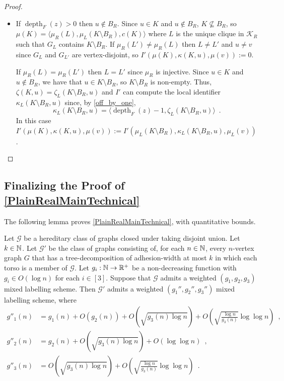 \documentclass{patmorin}
\let\eqref\cref
\newcommand{\david}[1]{\noindent{\color{orange} DW: #1}}
\newcommand{\vida}[1]{\noindent{\color{pink} VD: #1}}
\DeclareMathOperator{\depth}{depth}
\newcommand{\Oh}{O}
\begin{document}
\begin{proof}
\begin{itemize}
\begin{itemize}
      \item If $\depth_F(z)>0$ then $u\not\in B_R$.  Since $u\in K$ and $u\not\in B_R$, $K\not\subseteq B_R$, so $\mu(K)=\langle \mu_R(L),\mu_{L}(K\setminus B_R),c(K)\rangle$ where $L$ is the unique clique in $\mathcal{K}_R$ such that $G_L$ contains $K\setminus B_R$.  If $\mu_R(L')\neq \mu_R(L)$ then $L\neq L'$ and $u\neq v$ since $G_{L}$ and $G_{L'}$ are vertex-disjoint, so $I'(\mu(K),\kappa(K,u),\mu(v)):=0$.

      If $\mu_R(L)=\mu_R(L')$ then $L=L'$ since $\mu_R$ is injective.
      Since $u\in K$ and $u\not\in B_R$, we have that $u\in K\setminus B_R$, so $K\setminus B_R$ is non-empty. Thus, $\zeta(K,u)=\zeta_L(K\setminus B_R,u)$
      and $I'$ can compute the local identifier $\kappa_L(K\setminus B_R,u)$ since, by \eqref{off_by_one},
      \[
        \kappa_L(K\setminus B_R,u) = \langle \depth_F(z)-1, \zeta_L(K\setminus B_R,u)\rangle\enspace.
      \]
      In this case $I'(\mu(K),\kappa(K,u),\mu(v)):=I'(\mu_L(K\setminus B_R),\kappa_L(K\setminus B_R,u),\mu_L(v))$. \qedhere
    \end{itemize}
  \end{itemize}
\end{proof}

\subsection{Finalizing the Proof of \texorpdfstring{\cref{PlainRealMainTechnical}}{Theorem \ref*{PlainRealMainTechnical}}}
\label{sec:finalizing}

The following lemma proves \cref{PlainRealMainTechnical}, with quantitative bounds.

\begin{lem}\label{RealMainTechnical}
  Let $\mathcal{G}$ be a hereditary class of graphs closed under taking disjoint union.
  Let $k\in\mathbb{N}$.
  Let $\mathcal{G}'$ be the class of graphs consisting of, for each $n\in\mathbb{N}$,  every $n$-vertex graph $G$ that has a tree-decomposition of adhesion-width at most $k$ in which each torso is a member of $\mathcal{G}$.
  Let $g_i:\mathbb{N}\to\mathbb{R}^+$ be a non-decreasing function with $g_i\in\Oh(\log n)$ for each $i\in[3]$.
  Suppose that $\mathcal{G}$ admits a weighted $(g_1,g_2,g_3)$ mixed labelling scheme.
  Then $\mathcal{G}'$ admits a weighted $(g_1'',g_2'',g_3'')$ mixed labelling scheme, where
  \begin{align*}
    g''_1(n)
     & = g_1(n) + \Oh(g_2(n)) + \Oh\left(\sqrt{g_3(n)\log n}\right) + \Oh\left(\sqrt{\frac{\log n}{g_3(n)}}\log\log n\right) \enspace , \\
    g''_2(n)
     & = g_2(n) + \Oh\left(\sqrt{g_3(n)\log n}\right) + \Oh(\log\log n)  \enspace ,                                                     \\
    g''_3(n)
     & = \Oh\left(\sqrt{g_3(n)\log n}\right) + \Oh\left(\sqrt{\frac{\log n}{g_3(n)}}\log\log n\right) \enspace .
  \end{align*}
\end{lem}
\end{document}
